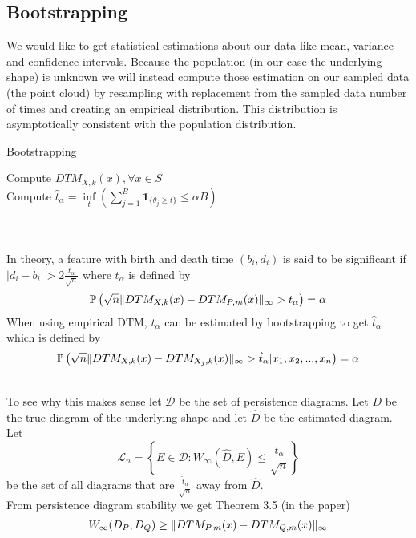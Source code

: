 \documentclass[11pt]{article}
\theoremstyle{definition}
\theoremstyle{definition}
\begin{document}
\subsection{Bootstrapping}
We would like to get statistical estimations about our data like mean, variance and confidence intervals. Because the population (in our case the underlying shape) is unknown we will instead compute those estimation on our sampled data (the point cloud) by resampling with replacement from the sampled data number of times and creating an empirical distribution. This distribution is asymptotically consistent with the population distribution.\\
$\text{ }$\\
\begin{algorithm}[H]
\caption{Bootstrapping}
\SetAlgoLined
{}
Compute $DTM_{X,k}(x), \forall x \in S$\\
Compute $\hat t_\alpha = \underset{t}{\inf} \left(\sum_{j=1}^B \textbf{1}_{\{\theta_j \geq t\}} \leq \alpha B \right)$\\

\end{algorithm}

\text{ }\\
\text{ }\\
In theory, a feature with birth and death time $(b_i,d_i)$ is said to be significant if $|d_i - b_i| > 2\frac{t_\alpha}{\sqrt{n}}$ where $t_\alpha$ is defined by
$$\mathbb{P} \left( \sqrt{n} \mathopen\| DTM_{X,k}(x) - DTM_{P,m}(x) \mathclose\|_\infty > t_\alpha \right) = \alpha$$
When using empirical DTM, $t_\alpha$ can be estimated by bootstrapping to get $\hat t_\alpha$ which is defined by
$$\mathbb{P} \left( \sqrt{n} \mathopen\| DTM_{X,k}(x) - DTM_{X_j,k}(x) \mathclose\|_\infty > \hat t_\alpha | x_1,x_2,...,x_n \right) = \alpha$$

\text{ }\\
To see why this makes sense let $\mathcal{D}$ be the set of persistence diagrams. Let $D$ be the true diagram of the underlying shape and let $\hat D$ be the estimated diagram. Let
$$\mathcal{L}_n = \left\{ E \in \mathcal{D} : W_\infty(\hat D, E) \leq \frac{\hat t_\alpha}{\sqrt{n}} \right\}$$
be the set of all diagrams that are $\frac{\hat t_\alpha}{\sqrt{n}}$ away from $\hat D$.\\
From persistence diagram stability we get Theorem 3.5 (in the paper)
$$W_\infty (D_P,D_Q) \geq \mathopen\| DTM_{P,m}(x) - DTM_{Q,m}(x) \mathclose\|_\infty$$
\end{document}
